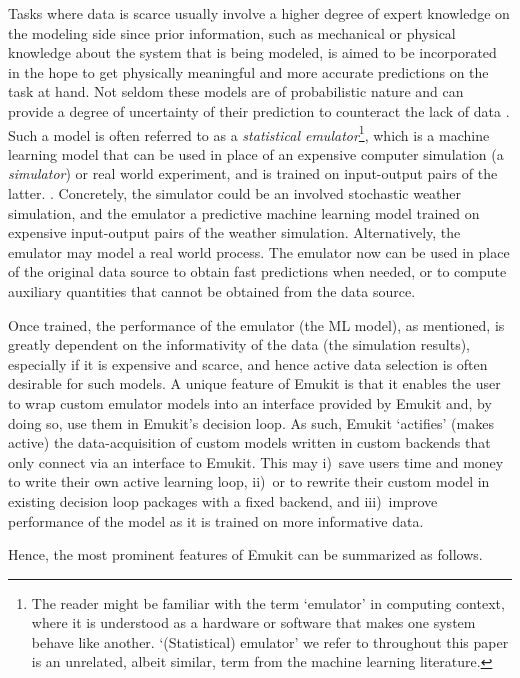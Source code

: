 Tasks where data is scarce usually involve a higher degree of expert knowledge on the modeling side since prior information, such as mechanical or physical knowledge about the system that is being modeled, is aimed to be incorporated in the hope to get physically meaningful and more accurate predictions on the task at hand. Not seldom these models are of probabilistic nature and can provide a degree of uncertainty of their prediction to counteract the lack of data \cite{RasmussenWilliams2006, Ho1995, MacKay1991APB, Smith1998UncertaintyAA}. Such a model is often referred to as a \emph{statistical emulator}\footnote{The reader might be familiar with the term `emulator' in computing context, where it is understood as a hardware or software that makes one system behave like another. `(Statistical) emulator' we refer to throughout this paper is an unrelated, albeit similar, term from the machine learning literature.}, which is a machine learning model that can be used in place of an expensive computer simulation (a \emph{simulator}) or real world experiment, and is trained on input-output pairs of the latter. \cite{Kennedy2000, Kennedy2001, Conti2009, Conti2010}. Concretely, the simulator could be an involved stochastic weather simulation, and the emulator a predictive machine learning model trained on expensive input-output pairs of the weather simulation. Alternatively, the emulator may model a real world process. The emulator now can be used in place of the original data source to obtain fast predictions when needed, or to compute auxiliary quantities that cannot be obtained from the data source.

Once trained, the performance of the emulator (the ML model), as mentioned, is greatly dependent on the informativity of the data (the simulation results), especially if it is expensive and scarce, and hence active data selection is often desirable for such models. A unique feature of Emukit is that it enables the user to wrap custom emulator models into an interface provided by Emukit and, by doing so, use them in Emukit's decision loop. As such, Emukit `actifies' (makes active) the data-acquisition of custom models written in custom backends that only connect via an interface to Emukit. This may i)~save users time and money to write their own active learning loop, ii)~or to rewrite their custom model in existing decision loop packages with a fixed backend, and iii)~improve performance of the model as it is trained on more informative data.

Hence, the most prominent features of Emukit can be summarized as follows.


